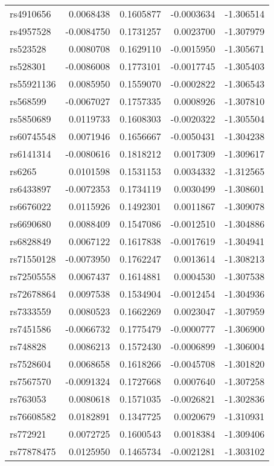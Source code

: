 \documentclass[
]{article}
\theoremstyle{plain}
\begin{document}
{\begin{longtable}[t]{lrrrr}
rs4910656 & 0.0068438 & 0.1605877 & -0.0003634 & -1.306514\\
rs4957528 & -0.0084750 & 0.1731257 & 0.0023700 & -1.307979\\
rs523528 & 0.0080708 & 0.1629110 & -0.0015950 & -1.305671\\
rs528301 & -0.0086008 & 0.1773101 & -0.0017745 & -1.305403\\
rs55921136 & 0.0085950 & 0.1559070 & -0.0002822 & -1.306543\\
\addlinespace
rs568599 & -0.0067027 & 0.1757335 & 0.0008926 & -1.307810\\
rs5850689 & 0.0119733 & 0.1608303 & -0.0020322 & -1.305504\\
rs60745548 & 0.0071946 & 0.1656667 & -0.0050431 & -1.304238\\
rs6141314 & -0.0080616 & 0.1818212 & 0.0017309 & -1.309617\\
rs6265 & 0.0101598 & 0.1531153 & 0.0034332 & -1.312565\\
\addlinespace
rs6433897 & -0.0072353 & 0.1734119 & 0.0030499 & -1.308601\\
rs6676022 & 0.0115926 & 0.1492301 & 0.0011867 & -1.309078\\
rs6690680 & 0.0088409 & 0.1547086 & -0.0012510 & -1.304886\\
rs6828849 & 0.0067122 & 0.1617838 & -0.0017619 & -1.304941\\
rs71550128 & -0.0073950 & 0.1762247 & 0.0013614 & -1.308213\\
\addlinespace
rs72505558 & 0.0067437 & 0.1614881 & 0.0004530 & -1.307538\\
rs72678864 & 0.0097538 & 0.1534904 & -0.0012454 & -1.304936\\
rs7333559 & 0.0080523 & 0.1662269 & 0.0023047 & -1.307959\\
rs7451586 & -0.0066732 & 0.1775479 & -0.0000777 & -1.306900\\
rs748828 & 0.0086213 & 0.1572430 & -0.0006899 & -1.306004\\
\addlinespace
rs7528604 & 0.0068658 & 0.1618266 & -0.0045708 & -1.301820\\
rs7567570 & -0.0091324 & 0.1727668 & 0.0007640 & -1.307258\\
rs763053 & 0.0080618 & 0.1571035 & -0.0026821 & -1.302836\\
rs76608582 & 0.0182891 & 0.1347725 & 0.0020679 & -1.310931\\
rs772921 & 0.0072725 & 0.1600543 & 0.0018384 & -1.309406\\
\addlinespace
rs77878475 & 0.0125950 & 0.1465734 & -0.0021281 & -1.303102\\

\end{longtable}}
\end{document}

